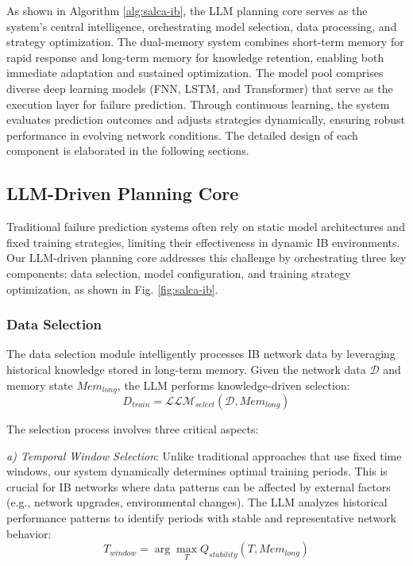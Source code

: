 \documentclass[conference]{IEEEtran}
\begin{document}
As shown in Algorithm \ref{alg:salca-ib}, the LLM planning core serves as the system's central intelligence, orchestrating model selection, data processing, and strategy optimization. The dual-memory system combines short-term memory for rapid response and long-term memory for knowledge retention, enabling both immediate adaptation and sustained optimization. The model pool comprises diverse deep learning models (FNN, LSTM, and Transformer) that serve as the execution layer for failure prediction. Through continuous learning, the system evaluates prediction outcomes and adjusts strategies dynamically, ensuring robust performance in evolving network conditions. The detailed design of each component is elaborated in the following sections.

\subsection{LLM-Driven Planning Core}
Traditional failure prediction systems often rely on static model architectures and fixed training strategies, limiting their effectiveness in dynamic IB environments. Our LLM-driven planning core addresses this challenge by orchestrating three key components: data selection, model configuration, and training strategy optimization, as shown in Fig. \ref{fig:salca-ib}.

\subsubsection{Data Selection}
The data selection module intelligently processes IB network data by leveraging historical knowledge stored in long-term memory. Given the network data $\mathcal{D}$ and memory state $Mem_{long}$, the LLM performs knowledge-driven selection:
\begin{equation}
    D_{train} = \mathcal{LLM}_{select}(\mathcal{D}, Mem_{long})
\end{equation}

The selection process involves three critical aspects:

\textit{a) Temporal Window Selection}: Unlike traditional approaches that use fixed time windows, our system dynamically determines optimal training periods. This is crucial for IB networks where data patterns can be affected by external factors (e.g., network upgrades, environmental changes). The LLM analyzes historical performance patterns to identify periods with stable and representative network behavior:
\begin{equation}
    T_{window} = \arg\max_T Q_{stability}(T, Mem_{long})
\end{equation}
\end{document}
